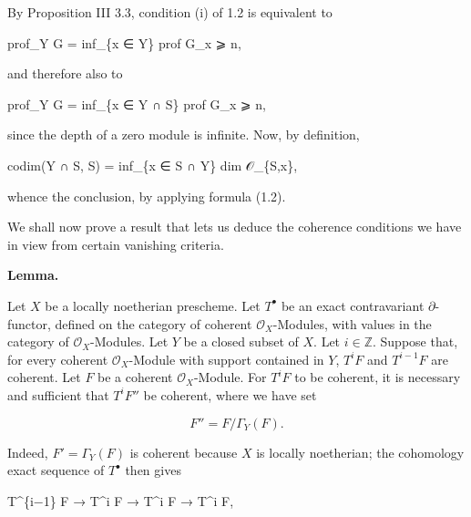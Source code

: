 \documentclass[
  11pt,
  a4paper,
]{book}
\newenvironment{Shaded}{}{}
\newcommand{\NormalTok}[1]{#1}
\begin{document}
By Proposition III 3.3, condition (i) of 1.2 is equivalent to

\begin{Shaded}
\begin{Highlighting}[]
\NormalTok{prof\_Y G = inf\_\{x ∈ Y\} prof G\_x ⩾ n,}
\end{Highlighting}
\end{Shaded}

and therefore also to

\begin{Shaded}
\begin{Highlighting}[]
\NormalTok{prof\_Y G = inf\_\{x ∈ Y ∩ S\} prof G\_x ⩾ n,}
\end{Highlighting}
\end{Shaded}

since the depth of a zero module is infinite. Now, by definition,

\begin{Shaded}
\begin{Highlighting}[]
\NormalTok{codim(Y ∩ S, S) = inf\_\{x ∈ S ∩ Y\} dim 𝒪\_\{S,x\},}
\end{Highlighting}
\end{Shaded}

whence the conclusion, by applying formula (1.2).

We shall now prove a result that lets us deduce the coherence conditions
we have in view from certain vanishing criteria.

\textbf{Lemma.}

Let \(X\) be a locally noetherian prescheme. Let \(T^{\bullet}\) be an
exact contravariant \(\partial\)-functor, defined on the category of
coherent \(\mathcal{O}_{X}\)-Modules, with values in the category of
\(\mathcal{O}_{X}\)-Modules. Let \(Y\) be a closed subset of \(X\). Let
\(i \in \mathbb{Z}\). Suppose that, for every coherent
\(\mathcal{O}_{X}\)-Module with support contained in \(Y\), \(T^{i} F\)
and \(T^{i-1} F\) are coherent. Let \(F\) be a coherent
\(\mathcal{O}_{X}\)-Module. For \(T^{i} F\) to be coherent, it is
necessary and sufficient that \(T^{i} F''\) be coherent, where we have
set

\[ F'' = F/\Gamma_{Y}(F). \]

Indeed, \(F' = \Gamma_{Y}(F)\) is coherent because \(X\) is locally
noetherian; the cohomology exact sequence of \(T^{\bullet}\) then gives

\begin{Shaded}
\begin{Highlighting}[]
\NormalTok{T\^{}\{i−1\} F\textquotesingle{} → T\^{}i F\textquotesingle{}\textquotesingle{} → T\^{}i F → T\^{}i F\textquotesingle{},}
\end{Highlighting}
\end{Shaded}
\end{document}
